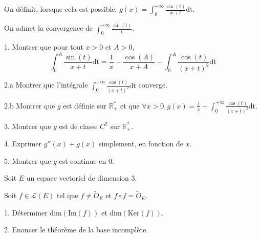 \subetoiles
\columnbreak



\noindent On définit, lorsque cela est possible,
$\displaystyle g(x) = \int_{0}^{+\infty} \frac {\sin(t)} {x+t} \mathrm{dt}$.

\noindent On admet la convergence de $\displaystyle \int_{0}^{+\infty} \frac {\sin(t)} {t}$.

\vspace{5pt}
1. Montrer que pour tout $x > 0$ et $A > 0$, 
\[
\int_{0}^{A} \frac {\sin(t)} {x+t} \mathrm{dt} = \frac {1} {x} - \frac {\cos(A)} {x + A} - \int_{0}^{A} \frac {\cos(t)} {(x+t)^2} \mathrm{dt}
\]

\vspace{5pt}
2.a Montrer que l'intégrale $\displaystyle \int_{0}^{+\infty} \frac {\cos(t)} {(x+t)^2} \mathrm{dt}$ converge.

\vspace{5pt}
2.b Montrer que $g$ est définie sur $\mathbb{R}_+^*$ et que
$\displaystyle \forall x > 0, g(x) = \frac {1} {x} - \int_{0}^{+\infty} \frac {\cos(t)} {(x+t)^2}\mathrm{dt}$.

\vspace{5pt}
3. Montrer que $g$ est de classe $C^2$ sur $\mathbb{R}_+^*$.

\vspace{5pt}
4. Exprimer $g''(x) + g(x)$ simplement, en fonction de $x$.

\vspace{5pt}
5. Montrer que $g$ est continue en 0.



\subetoiles



\noindent Soit $E$ un espace vectoriel de dimension 3.

\noindent Soit $f \in \mathcal{L}(E)$ tel que $f \ne \tilde{O}_E$ et $f \circ f = \tilde{O}_E$.

\vspace{5pt}
1. Déterminer $\mathrm{dim}(\mathrm{Im}(f))$ et $\mathrm{dim}(\mathrm{Ker}(f))$.

\vspace{5pt}
2. Enoncer le théorème de la base incomplète.